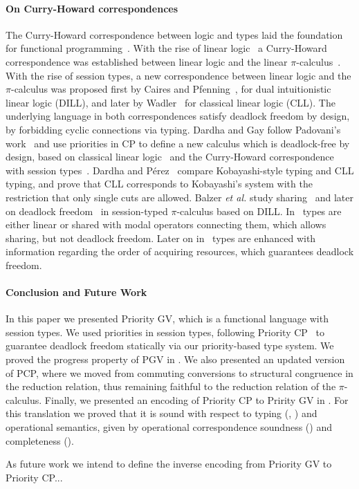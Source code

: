 \documentclass[main.tex]{subfiles}
\begin{document}
\paragraph{On Curry-Howard correspondences}
The Curry-Howard correspondence between logic and types laid the foundation for functional programming~\cite{wadler12}. With the rise of linear logic~\cite{girard87} a Curry-Howard correspondence was established between linear logic and the linear $\pi$-calculus~\cite{abramsky94,bellinscott94}. With the rise of session types, a new correspondence between linear logic and the $\pi$-calculus was proposed first by Caires and Pfenning~\cite{cairespfenning10}, for dual intuitionistic linear logic (DILL), and later by Wadler~\cite{wadler12} for classical linear logic (CLL). The underlying language in both correspondences satisfy deadlock freedom by design, by forbidding cyclic connections via typing. Dardha and Gay follow Padovani's work~\cite{padovani14} and use priorities in CP to define a new calculus which is deadlock-free by design, based on classical linear logic~\cite{girard87}  and the Curry-Howard correspondence with session types~\cite{wadler12}. Dardha and P\'{e}rez~\cite{dardhaperez15} compare Kobayashi-style typing and CLL typing, and prove that CLL corresponds to Kobayashi's system with the restriction that only single cuts are allowed. Balzer \emph{et al.} study sharing~\cite{balzerpfenning17} and later on deadlock freedom~\cite{balzertoninho19} in session-typed $\pi$-calculus based on DILL. In~\cite{balzerpfenning17} types are either linear or shared with modal operators connecting them, which allows sharing, but not deadlock freedom. Later on in~\cite{balzertoninho19} types are enhanced with information regarding the order of acquiring resources, which guarantees deadlock freedom.

\paragraph{Conclusion and Future Work}
In this paper we presented Priority GV, which is a functional language with session types. We used priorities in session types, following Priority CP~\cite{dardhagay18} to guarantee deadlock freedom statically via our priority-based type system. We proved the progress property of PGV in . We also presented an updated version of PCP, where we moved from commuting conversions to structural congruence in the reduction relation, thus remaining faithful to the reduction relation of the $\pi$-calculus. Finally, we presented an encoding of Priority CP to Pririty GV in . For this translation we proved that it is sound with respect to typing (, ) and operational semantics, given by operational correspondence soundness () and completeness ().

As future work we intend to define the inverse encoding from Priority GV to Priority CP...
\end{document}
